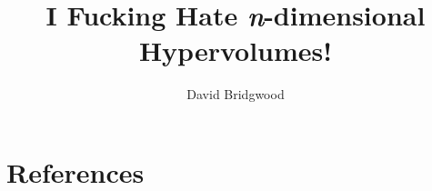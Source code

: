 \documentclass[a4paper,12pt,oneside]{article}
\begin{document}
\title{I Fucking Hate \emph{n}-dimensional Hypervolumes!}

\author{David Bridgwood}

\maketitle

\preface




\body
\normalsize

\clearpage






\clearpage
\onehalfspacing
\section{References}
{\def\section*#1{}
	
}


\clearpage

\end{document}
